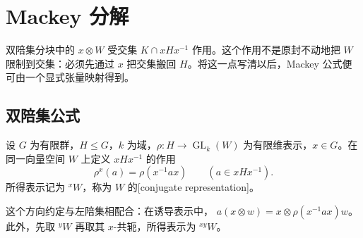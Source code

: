 

\section{Mackey 分解}
\label{b5:sec:0402}

双陪集分块中的 \(x\otimes W\) 受交集 \(K\cap xHx^{-1}\) 作用。这个作用不是原封不动地把 \(W\) 限制到交集：必须先通过 \(x\) 把交集搬回 \(H\)。将这一点写清以后，Mackey 公式便可由一个显式张量映射得到。

\subsection{双陪集公式}
\label{b5:subsec:0402:01}

\begin{definition}\label{b5:def:conjugate-representation}
	设 \(G\) 为有限群，\(H\leq G\)，\(k\) 为域，\(\rho:H\to\operatorname{GL}_k(W)\) 为有限维表示，\(x\in G\)。在同一向量空间 \(W\) 上定义 \(xHx^{-1}\) 的作用
	\[
		\rho^x(a)=\rho(x^{-1}ax)\qquad(a\in xHx^{-1}).
	\]
	所得表示记为 \({}^xW\)，称为 \(W\) 的[conjugate representation]。
\end{definition}

这个方向约定与左陪集相配合：在诱导表示中， \(a(x\otimes w)=x\otimes\rho(x^{-1}ax)w\)。此外，先取 \({}^yW\) 再取其 \(x\)-共轭，所得表示为 \({}^{xy}W\)。

